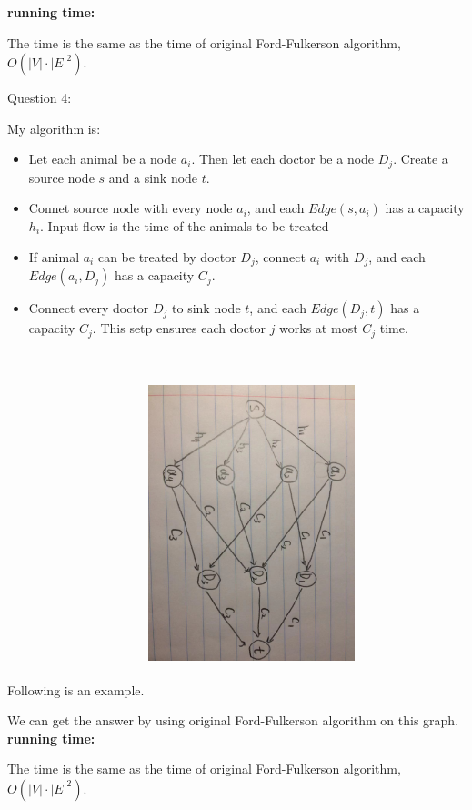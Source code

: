 \documentclass[12pt]{article}
\begin{document}
\textbf{running time:} \par
The time is the same as the time of original Ford-Fulkerson algorithm, $O(|V|\cdot|E|^2)$.



\pagebreak
\noindent
\large Question 4: \par
\normalsize 
My algorithm is: 

\begin{itemize}
  \item Let each animal be a node $a_i$. Then let each doctor be a node $D_j$. Create a source node $s$ and a sink node $t$. 
  \item Connet source node with every node $a_i$, and each $Edge(s, a_i)$ has a capacity $h_i$.
	Input flow is the time of the animals to be treated 
  \item If animal $a_i$ can be treated by doctor $D_j$, connect $a_i$ with $D_j$, and each $Edge(a_i, D_j)$ has a capacity $C_j$.
  \item Connect every doctor $D_j$ to sink node $t$, and each $Edge(D_j, t)$ has a capacity $C_j$. 
	This setp ensures each doctor $j$ works at most $C_j$ time. 

\end{itemize}

Following is an example.
\includegraphics[width=6cm, height=10cm, angle=90,origin=c]{question4}
\par
We can get the answer by using original Ford-Fulkerson algorithm on this graph.
\\

\textbf{running time:} \par
The time is the same as the time of original Ford-Fulkerson algorithm, $O(|V|\cdot|E|^2)$.
\end{document}

